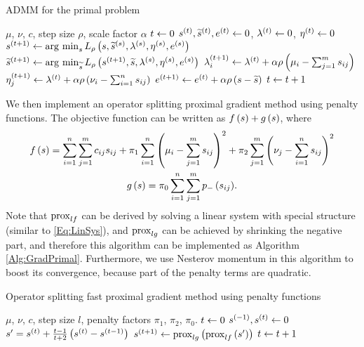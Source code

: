 \documentclass[english]{pkupaper}
\begin{document}
\begin{algorithm}
\caption{ADMM for the primal problem}
\label{Alg:ADMMPrimal}
\begin{algorithmic}
\REQUIRE $\mu$, $\nu$, $c$, step size $\rho$, scale factor $\alpha$
\STATE $ t \leftarrow 0 $
\STATE $ s^{\left( t \right)}, \widetilde{s}^{\left( t \right)}, e^{\left( t \right)} \leftarrow 0 $, $ \lambda^{\left( t \right)} \leftarrow 0 $, $ \eta^{\left( t \right)} \leftarrow 0 $
\STATE $ s^{\left(  t + 1  \right)} \leftarrow \operatorname*{\arg\,\min}_s L_{\rho} \left(  s, \widetilde{s}^{\left( s \right)}, \lambda^{\left( s \right)}, \eta^{\left( s \right)}, e^{\left( s \right)}  \right) $
\STATE $ \widetilde{s}^{\left(  t + 1  \right)} \leftarrow \operatorname*{\arg\,\min}_{\widetilde{s}} L_{\rho} \left(  s^{\left(  t + 1  \right)}, \widetilde{s}, \lambda^{\left( s \right)}, \eta^{\left( s \right)}, e^{\left( s \right)}  \right) $
\STATE $ \lambda^{\left(  t + 1  \right)}_i \leftarrow \lambda^{\left( t \right)} + \alpha \rho \left(  \mu_i - \sum_{ {j} = {1} }^{m}{s_{ i j }}  \right) $
\STATE $ \eta^{\left(  t + 1  \right)}_j \leftarrow \lambda^{\left( t \right)} + \alpha \rho \left(  \nu_i - \sum_{ {i} = {1} }^{n}{s_{ i j }}  \right) $
\STATE $ e^{\left(  t + 1  \right)} \leftarrow e^{\left( t \right)} + \alpha \rho \left(  s - \widetilde{s}  \right) $
\STATE $ t \leftarrow t + 1 $
\ENDWHILE
\end{algorithmic}
\end{algorithm}

We then implement an operator splitting proximal gradient method using penalty functions. The objective function can be written as $ f \left( s \right) + g \left( s \right) $, where
\begin{gather}
f \left( s \right) = \sum_{ {i} = {1} }^{n}{\sum_{ {j} = {1} }^{m}{ c_{ i j } s_{ i j } }} + \pi_1 \sum_{ {i} = {1} }^{n}{\left(  \mu_i - \sum_{ {j} = {1} }^{m}{s_{ i j }}  \right)^2} + \pi_2 \sum_{ {j} = {1} }^{m}{\left(  \nu_j - \sum_{ {i} = {1} }^{n}{s_{ i j }}  \right)^2} \\
g \left( s \right) = \pi_0 \sum_{ {i} = {1} }^{n}{\sum_{ {j} = {1} }^{m}{ p_- \left( s_{ i j } \right) }}.
\end{gather}
Note that $ \operatorname{\mathrm{prox}}_{ l f } $ can be derived by solving a linear system with special structure (similar to \eqref{Eq:LinSys}), and $ \operatorname{\mathrm{prox}}_{ l g } $ can be achieved by shrinking the negative part, and therefore this algorithm can be implemented as Algorithm \ref{Alg:GradPrimal}. Furthermore, we use Nesterov momentum in this algorithm to boost its convergence, because part of the penalty terms are quadratic.

\begin{algorithm}
\caption{Operator splitting fast proximal gradient method using penalty functions}
\label{Alg:GradPrimal}
\begin{algorithmic}
\REQUIRE $\mu$, $\nu$, $c$, step size $l$, penalty factors $\pi_1$, $\pi_2$, $\pi_0$.
\STATE $ t \leftarrow 0 $
\STATE $ s^{\left( -1 \right)}, s^{\left( t \right)} \leftarrow 0 $
\STATE $ s' = s^{\left( t \right)} + \frac{ t - 1 }{ t + 2 } \left(  s^{\left( t \right)} - s^{\left(  t - 1  \right)}  \right) $
\STATE $ s^{\left(  t + 1  \right)} \leftarrow \operatorname{\mathrm{prox}}_{ l g } \left(  \operatorname{\mathrm{prox}}_{ l f } \left( s' \right)  \right) $
\STATE $ t \leftarrow t + 1 $
\ENDWHILE
\end{algorithmic}
\end{algorithm}
\end{document}

